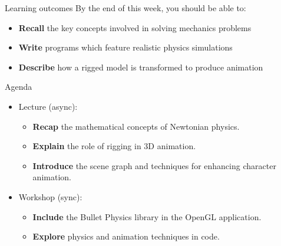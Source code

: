 \begin{frame}{Learning outcomes}
	By the end of this week, you should be able to:
	\begin{itemize}
		\item \textbf{Recall} the key concepts involved in solving mechanics problems
		\item \textbf{Write} programs which feature realistic physics simulations
		\item \textbf{Describe} how a rigged model is transformed to produce animation
	\end{itemize}
\end{frame}

\begin{frame}{Agenda}
	\begin{itemize}
		\pause\item Lecture (async):
		\begin{itemize}
			\item \textbf{Recap} the mathematical concepts of Newtonian physics.
			\item \textbf{Explain} the role of rigging in 3D animation.
			\item \textbf{Introduce} the scene graph and techniques for enhancing character animation.
		\end{itemize}
		\pause\item Workshop (sync):
		\begin{itemize}
			\item \textbf{Include} the Bullet Physics library in the OpenGL application.
			\item \textbf{Explore} physics and animation techniques in code.
		\end{itemize}
	\end{itemize}
\end{frame}